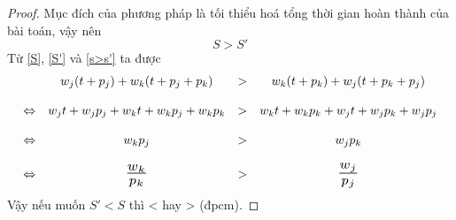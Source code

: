 \documentclass[12pt,a4paper]{report}
\begin{document}
\begin{proof}
	Mục đích của phương pháp là tối thiểu hoá tổng thời gian hoàn thành của bài toán, vậy nên
	\begin{equation} \label{s>s'}
		S > S'
	\end{equation}
	Từ \eqref{S}, \eqref{S'} và \eqref{s>s'} ta được
        \begin{equation*}
        \begin{array}{c c c c}
		& w_j(t+p_j) + w_k(t+p_j+p_k) &>& w_k(t+p_k) + w_j(t+p_k+p_j) \\
		\\
		\Leftrightarrow & w_jt + w_jp_j + w_kt + w_k p_j + w_kp_k &>& w_k t + w_k p_k + w_j t + w_j p_k + w_j p_j \\
		\\
		\Leftrightarrow & w_k p_j &>& w_j p_k \\
		\\
		\Leftrightarrow & \scalebox{1.5}{$\frac{w_k}{p_k}$} &>& \scalebox{1.5}{$\frac{w_j}{p_j}$} \\
        \end{array}
        \end{equation*}
		Vậy nếu muốn $S'<S$ thì  <  hay  >  (đpcm).
\end{proof}
\end{document}
